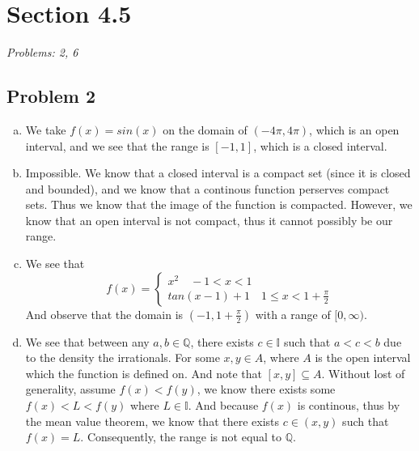 \documentclass[12pt]{article}
\begin{document}

\section*{Section 4.5}
\textit{Problems: 2, 6}
\subsection*{Problem 2}
\begin{enumerate}[a).]
    \item {
        We take $f(x) = sin(x)$ on the domain of $(-4\pi, 4 \pi)$, which is an open interval, and we see that the range is $[-1, 1]$, which is a closed interval.
    }
    \item {
        Impossible. 
        We know that a closed interval is a compact set (since it is closed and bounded), and we know that a continous function perserves compact sets. 
        Thus we know that the image of the function is compacted. 
        However, we know that an open interval is not compact, thus it cannot possibly be our range. 
    }
    \item {
        We see that 
        $$
            f(x) =
            \left\{
                \begin{array}{ll}
                    x^2 \quad -1 < x < 1 \\
                    tan(x-1)+1 \quad 1 \le x < 1 + \frac{\pi}{2}
                    
                \end{array} \right.
        $$
        And observe that the domain is $(-1, 1 + \frac{\pi}{2})$ with a range of $[0, \infty)$. 
    }
    \item {
        We see that between any $a,b \in \mathbb{Q}$, there exists $c \in \mathbb{I}$ such that $a< c < b$ due to the density the irrationals. 
        For some $x, y \in A$, where $A$ is the open interval which the function is defined on.
        And note that $[x,y] \subseteq A$.
        Without lost of generality, assume $f(x) < f(y)$, we know there exists some $f(x) < L < f(y)$ where $L \in \mathbb{I}$. 
        And because $f(x)$ is continous, thus by the mean value theorem, we know that there exists $c \in (x,y)$ such that $f(x) = L$. 
        Consequently, the range is not equal to $\mathbb{Q}$. 
    }
\end{enumerate}
\end{document}
